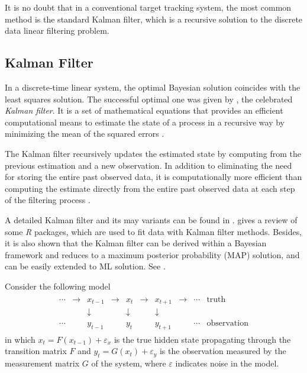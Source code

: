 It is no doubt that in a conventional target tracking system, the most common method is the standard Kalman filter, which is a recursive solution to the discrete data linear filtering problem. 



\subsection*{Kalman Filter}

In a discrete-time linear system, the optimal Bayesian solution coincides with the least squares solution. The successful optimal one was given by \cite{kalman1960new}, the celebrated \textit{Kalman filter}. It is a set of mathematical equations that provides an efficient computational means to estimate the state of a process in a recursive way by minimizing the mean of the squared errors \citep{bishop2001introduction}. 

The Kalman filter recursively updates the estimated state by computing from the previous estimation and a new observation. In addition to eliminating the need for storing the entire past observed data, it is computationally more efficient than computing the estimate directly from the entire past observed data at each step of the filtering process \citep{haykin2001kalman}.  

A detailed Kalman filter and its may variants can be found in \citep{chen2003bayesian, rhodes1971tutorial, kailath1981lectures, sorenson1985kalman}. \cite{tusell2011kalman} gives a review of some \textit{R} packages, which are used to fit data with Kalman filter methods. Besides, it is also shown that the Kalman filter can be derived within a Bayesian framework and reduces to a maximum posterior probability (MAP) solution, and can be easily extended to ML solution. See \eg \citep{haykin2001kalman, guzzi2016data}. 

Consider the following model 
\begin{align}\label{introKFmodel}
\begin{array}{cccccccccc}\cdots &\to &x_{t-1}&\to &x_{t}&\to &x_{t+1}&\to &\cdots &{\text{truth}}\\ &&\downarrow &&\downarrow &&\downarrow && &\\ \cdots&&y_{t-1}&&y_{t}&&y_{t+1}&&\cdots &{\text{observation}}\end{array}
 \end{align}
in which $x_t=F(x_{t-1})+\varepsilon_x$ is the true hidden state propagating through the transition matrix $F$ and $y_t=G(x_t)+\varepsilon_y$ is the observation measured by the measurement matrix $G$ of the system, where $\varepsilon$ indicates \iid noise in the model. 

